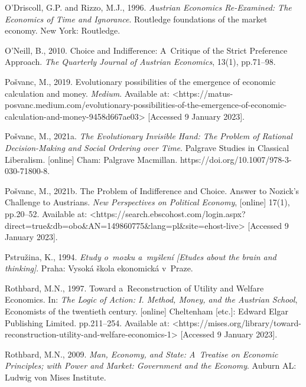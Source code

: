 O'Driscoll, G.P. and Rizzo, M.J., 1996. \textit{Austrian Economics Re-Examined: The Economics of Time and Ignorance}. Routledge foundations of the market economy. New York: Routledge.



O'Neill, B., 2010. Choice and Indifference: A~Critique of the Strict Preference Approach. \textit{The Quarterly Journal of Austrian Economics}, 13(1), pp.71–98.



Pošvanc, M., 2019. Evolutionary possibilities of the emergence of economic calculation and money. \textit{Medium}. Available at: {\textless}https://matus-posvanc.medium.com/evolutionary-possibilities-of-the-emergence-of-economic-calculation-and-money-9458d667ae03{\textgreater} [Accessed 9 January 2023].



Pošvanc, M., 2021a. \textit{The Evolutionary Invisible Hand: The Problem of Rational Decision-Making and Social Ordering over Time}. Palgrave Studies in Classical Liberalism. [online] Cham: Palgrave Macmillan. https://doi.org/10.1007/978-3-030-71800-8.



Pošvanc, M., 2021b. The Problem of Indifference and Choice. Answer to Nozick's Challenge to Austrians. \textit{New Perspectives on Political Economy}, [online] 17(1), pp.20–52. Available at: {\textless}https://search.ebscohost.com/login.aspx?direct=true\&db=obo\&AN=149860775\&lang=pl\&site=ehost-live{\textgreater} [Accessed 9 January 2023].



Pstružina, K., 1994. \textit{Etudy o~mozku a~myšlení [Etudes about the brain and thinking]}. Praha: Vysoká škola ekonomická v~Praze.



Rothbard, M.N., 1997. Toward a~Reconstruction of Utility and Welfare Economics. In: \textit{The Logic of Action: I. Method, Money, and the Austrian School}, Economists of the twentieth century. [online] Cheltenham [etc.]: Edward Elgar Publishing Limited. pp.211–254. Available at: {\textless}https://mises.org/library/toward-reconstruction-utility-and-welfare-economics-1{\textgreater} [Accessed 9 January 2023].



Rothbard, M.N., 2009. \textit{Man, Economy, and State: A~Treatise on Economic Principles; with Power and Market: Government and the Economy}. Auburn AL: Ludwig von Mises Institute.



